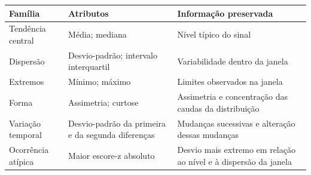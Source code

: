 \begin{tabularx}{\textwidth}{@{}p{3.0cm}p{5.0cm}X@{}}
\toprule
Família & Atributos & Informação preservada \\
\midrule
Tendência central & Média; mediana & Nível típico do sinal \\
Dispersão & Desvio-padrão; intervalo interquartil & Variabilidade dentro da janela \\
Extremos & Mínimo; máximo & Limites observados na janela \\
Forma & Assimetria; curtose & Assimetria e concentração das caudas da distribuição \\
Variação temporal & Desvio-padrão da primeira e da segunda diferenças & Mudanças sucessivas e alteração dessas mudanças \\
Ocorrência atípica & Maior escore-z absoluto & Desvio mais extremo em relação ao nível e à dispersão da janela \\
\bottomrule
\end{tabularx}
